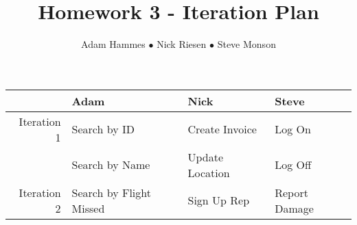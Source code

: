 \documentclass[12pt]{article}
\title{\vspace{.5in}Homework 3 - Iteration Plan}
\author{Adam Hammes $\bullet$ Nick Riesen $\bullet$ Steve Monson}
\begin{document}
\maketitle

\begin{center}
\begin{tabular}{| r | l | l | l |}
    \hline             & Adam                       & Nick                 & Steve \\
    \hline Iteration 1 & Search by ID               & Create Invoice       & Log On \\
                       & Search by Name             & Update Location      & Log Off \\
    \hline Iteration 2 & Search by Flight Missed    & Sign Up Rep          & Report Damage \\
                     
    \hline
\end{tabular}
\end{center}
\end{document}
